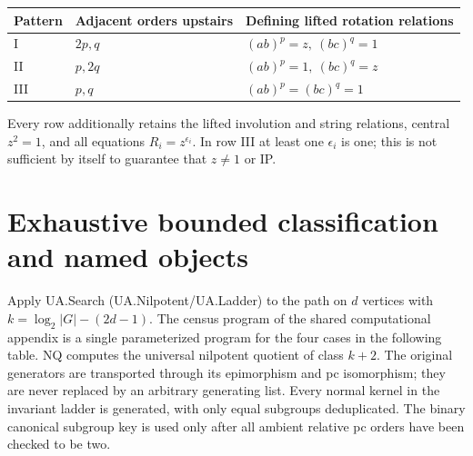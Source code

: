 {\def\LTcaptype{none} %
\begin{longtable}[]{@{}
  >{\raggedright\arraybackslash}p{}
  >{\raggedright\arraybackslash}p{}
  >{\raggedright\arraybackslash}p{}@{}}
\toprule\noalign{}
\begin{minipage}[b]{\linewidth}\raggedright
Pattern
\end{minipage} & \begin{minipage}[b]{\linewidth}\raggedright
Adjacent orders upstairs
\end{minipage} & \begin{minipage}[b]{\linewidth}\raggedright
Defining lifted rotation relations
\end{minipage} \\
\midrule\noalign{}
\endhead
\bottomrule\noalign{}
\endlastfoot
I & \(2p,q\) & \((ab)^p=z,\ (bc)^q=1\) \\
II & \(p,2q\) & \((ab)^p=1,\ (bc)^q=z\) \\
III & \(p,q\) & \((ab)^p=(bc)^q=1\) \\
\end{longtable}
}

Every row additionally retains the lifted involution and string relations, central \(z^2=1\), and all equations \(R_i=z^{\epsilon_i}\). In row III at least one \(\epsilon_i\) is one; this is not sufficient by itself to guarantee that \(z\ne1\) or IP.

\section{Exhaustive bounded classification and named objects}\label{exhaustive-bounded-classification-and-named-objects}

Apply UA.Search (UA.Nilpotent/UA.Ladder) to the path on \(d\) vertices with \(k=\log_2|G|-(2d-1)\). The census program of the shared computational appendix is a single parameterized program for the four cases in the following table. NQ computes the universal nilpotent quotient of class \(k+2\). The original generators are transported through its epimorphism and pc isomorphism; they are never replaced by an arbitrary generating list. Every normal kernel in the invariant ladder is generated, with only equal subgroups deduplicated. The binary canonical subgroup key is used only after all ambient relative pc orders have been checked to be two.

